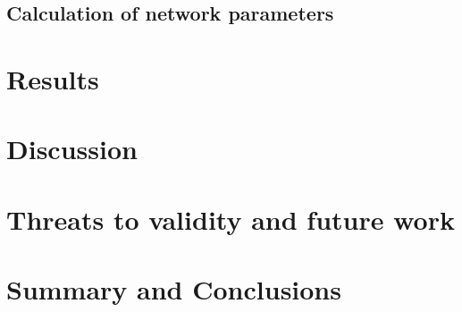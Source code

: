 \documentclass{article}
\begin{document}
\subsection{Calculation of network parameters}

\section{Results}

\section{Discussion}

\section{Threats to validity and future work}

\section{Summary and Conclusions}
\end{document}
